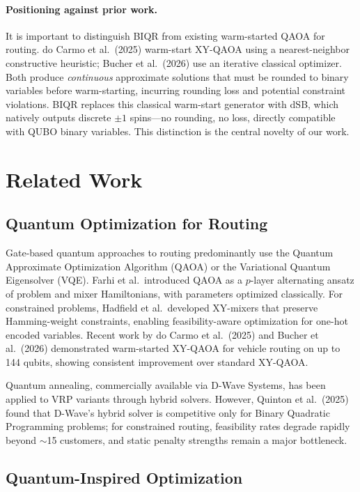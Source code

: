 \documentclass[11pt,a4paper]{article}
\theoremstyle{definition}
\begin{document}
\paragraph{Positioning against prior work.} It is important to distinguish BIQR from existing warm-started QAOA for routing. do Carmo et al.\ (2025) warm-start XY-QAOA using a nearest-neighbor constructive heuristic; Bucher et al.\ (2026) use an iterative classical optimizer. Both produce \emph{continuous} approximate solutions that must be rounded to binary variables before warm-starting, incurring rounding loss and potential constraint violations. BIQR replaces this classical warm-start generator with dSB, which natively outputs discrete $\pm 1$ spins---no rounding, no loss, directly compatible with QUBO binary variables. This distinction is the central novelty of our work.

\section{Related Work}\label{sec:related}

\subsection{Quantum Optimization for Routing}

Gate-based quantum approaches to routing predominantly use the Quantum Approximate Optimization Algorithm (QAOA) or the Variational Quantum Eigensolver (VQE). Farhi et al.\ introduced QAOA as a $p$-layer alternating ansatz of problem and mixer Hamiltonians, with parameters optimized classically. For constrained problems, Hadfield et al.\ developed XY-mixers that preserve Hamming-weight constraints, enabling feasibility-aware optimization for one-hot encoded variables. Recent work by do Carmo et al.\ (2025) and Bucher et al.\ (2026) demonstrated warm-started XY-QAOA for vehicle routing on up to 144 qubits, showing consistent improvement over standard XY-QAOA.

Quantum annealing, commercially available via D-Wave Systems, has been applied to VRP variants through hybrid solvers. However, Quinton et al.\ (2025) found that D-Wave's hybrid solver is competitive only for Binary Quadratic Programming problems; for constrained routing, feasibility rates degrade rapidly beyond $\sim$15 customers, and static penalty strengths remain a major bottleneck.

\subsection{Quantum-Inspired Optimization}
\end{document}
